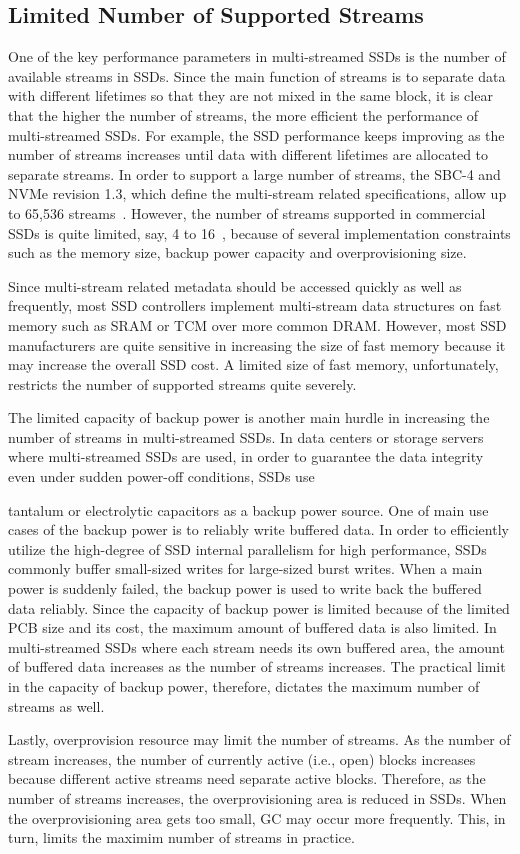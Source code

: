 \subsection{Limited Number of Supported Streams}
One of the key performance parameters in multi-streamed SSDs is the number of 
available streams in SSDs.  
Since the main function of  streams is to separate data with different lifetimes 
so that they are not mixed in the same block, it is clear that the 
higher the number of streams, the more efficient the performance of multi-streamed SSDs.
For example, the SSD performance keeps improving as the number of streams increases 
until data with different lifetimes are allocated to separate streams.   
In order to support a large number of streams, the SBC-4 and NVMe revision 1.3, which define the 
multi-stream related specifications, allow up to 65,536 streams~\cite{T10, NVMe}.  
However, the number of streams supported in
commercial SSDs is quite limited, say, 4 to 16~\cite{MultiStream, Level, AutoStream}, 
because of several implementation 
constraints such as the memory size, backup power capacity and overprovisioning size.

Since multi-stream related metadata should be accessed quickly as well as frequently, 
most SSD controllers implement multi-stream data structures on fast memory 
such as SRAM or TCM over more common DRAM.  
However, most SSD manufacturers are quite sensitive in increasing the size of 
fast memory because it may increase the overall SSD cost.   
A limited size of fast memory, unfortunately, restricts the number of
supported streams quite severely.

The limited capacity of backup power is another main hurdle in increasing 
the number of streams in multi-streamed SSDs.  
In data centers or storage servers where multi-streamed SSDs are used,
in order to guarantee the data integrity even under sudden power-off conditions, 
SSDs use 
{\color{blue}
tantalum or electrolytic capacitors as a backup power source.  
One of main use cases of the backup power is to reliably write buffered data.  
In order to efficiently utilize the high-degree of SSD
internal parallelism for high performance, SSDs commonly buffer small-sized 
writes for large-sized burst writes.   
When a main power is suddenly failed, the backup power is used to write back the
buffered data reliably.  
Since the capacity of backup power is limited because of the limited PCB size and 
its cost, the maximum amount of buffered data is also limited.  
In multi-streamed SSDs where
each stream needs its own buffered area, the amount of buffered data increases 
as the number of streams increases.  
The practical limit in the capacity of backup power, therefore, dictates the maximum
number of streams as well.

Lastly, overprovision resource may limit the number of streams.
As the number of stream increases, the number of currently active (i.e., open)
blocks increases because different active streams need separate active blocks.
Therefore, as the number of streams increases, the overprovisioning area is 
reduced in SSDs.  When the overprovisioning area gets too small, 
GC may occur more frequently.   
This, in turn, limits the
maximim number of streams in practice.  
}
